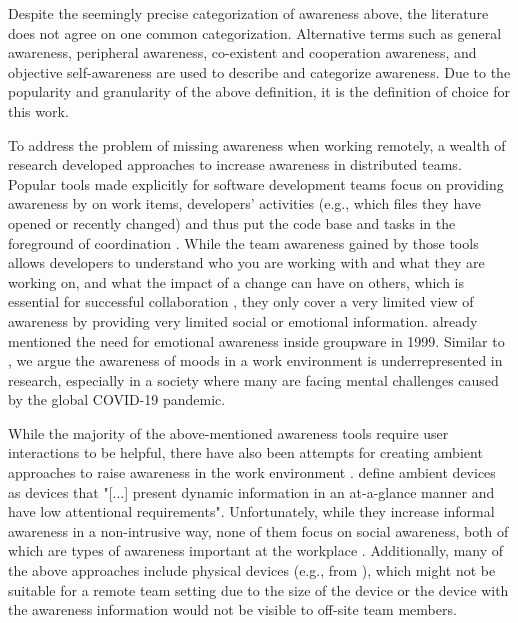 Despite the seemingly precise categorization of awareness above, the literature does not agree on one common categorization. Alternative terms such as general awareness, peripheral awareness, co-existent and cooperation awareness, and objective self-awareness are used to describe and categorize awareness. Due to the popularity and granularity of the above definition, it is the definition of choice for this work.

To address the problem of missing awareness when working remotely, a wealth of research developed approaches to increase awareness in distributed teams. Popular tools made explicitly for software development teams focus on providing awareness by on work items, developers' activities (e.g., which files they have opened or recently changed) and thus put the code base and tasks in the foreground of coordination \autocite{biehl2007fastdash, jakobsen2009wipdash, eick1992seesoft, deline2005easing}. While the team awareness gained by those tools allows developers to understand who you are working with and what they are working on, and what the impact of a change can have on others, which is essential for successful collaboration \autocite{dourish1992awareness}, they only cover a very limited view of awareness by providing very limited social or emotional information. \textcite{garcia1999emotional} already mentioned the need for emotional awareness inside groupware in 1999. Similar to \autocite{mora2011supporting}, we argue the awareness of moods in a work environment is underrepresented in research, especially in a society where many are facing mental challenges caused by the global COVID-19 pandemic.

While the majority of the above-mentioned awareness tools require user interactions to be helpful, there have also been attempts for creating ambient approaches to raise awareness in the work environment \autocite{morrison2020facilitating, otjacques2006ambient, downs2012ambient, alavi2012ambient, rocker2004using}. \textcite{downs2012ambient} define ambient devices as devices that "[...] present dynamic information in an at-a-glance manner and have low attentional requirements". Unfortunately, while they increase informal awareness in a non-intrusive way, none of them focus on social awareness, both of which are types of awareness important at the workplace \autocite{greenberg1996awareness}. Additionally, many of the above approaches include physical devices (e.g., from \autocite{ downs2012ambient, alavi2012ambient, rocker2004using}), which might not be suitable for a remote team setting due to the size of the device or the device with the awareness information would not be visible to off-site team members.

